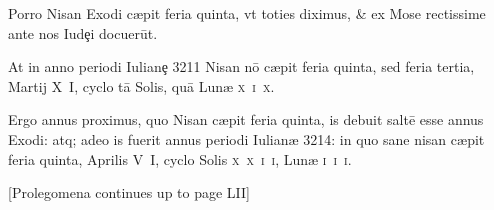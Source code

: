 \begin{parnumbers}
Porro Nisan Exodi cæpit feria quinta, vt toties diximus, \& ex Mose rectissime ante nos Iudȩi docuerūt.

At in anno periodi Iulianȩ 3211 Nisan nō cæpit feria quinta, sed feria tertia, Martij \textsc{X~I}, cyclo tā Solis, quā Lunæ \textsc{x~i~x}.

Ergo annus proximus, quo Nisan cæpit feria quinta, is debuit saltē esse annus Exodi: atq; adeo is fuerit annus periodi Iulianæ 3214: in quo sane nisan cæpit feria quinta, Aprilis \textsc{V~I},
cyclo Solis \textsc{x~x~i~i}, Lunæ \textsc{i~i~i}.

[Prolegomena continues up to page LII]

\end{parnumbers}
